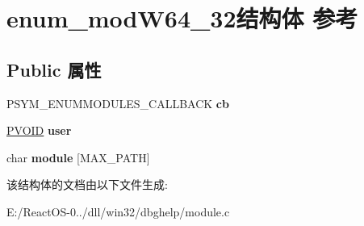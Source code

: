 \hypertarget{structenum__mod_w64__32}{}\section{enum\+\_\+mod\+W64\+\_\+32结构体 参考}
\label{structenum__mod_w64__32}
\subsection*{Public 属性}
\begin{DoxyCompactItemize}
\item 
\mbox{\label{structenum__mod_w64__32_af650d1bdf3f39a3d39a7c6cfd19a3d2f}} 
P\+S\+Y\+M\+\_\+\+E\+N\+U\+M\+M\+O\+D\+U\+L\+E\+S\+\_\+\+C\+A\+L\+L\+B\+A\+CK {\bfseries cb}
\item 
\mbox{\label{structenum__mod_w64__32_aff9a4d181631b274a25811daed20c0bf}} 
\hyperlink{interfacevoid}{P\+V\+O\+ID} {\bfseries user}
\item 
\mbox{\label{structenum__mod_w64__32_a293bc8c5e8f788e3054e7477fefde1f2}} 
char {\bfseries module} \mbox{[}M\+A\+X\+\_\+\+P\+A\+TH\mbox{]}
\end{DoxyCompactItemize}


该结构体的文档由以下文件生成\+:\begin{DoxyCompactItemize}
\item 
E\+:/\+React\+O\+S-\/0../dll/win32/dbghelp/module.\+c\end{DoxyCompactItemize}
